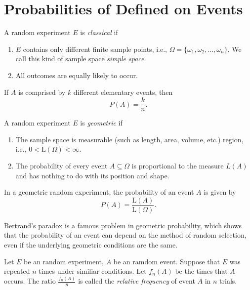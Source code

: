\section{Probabilities of Defined on Events}

\begin{definition}
  A random experiment \(E\) is \emph{classical} if
  \begin{enumerate}
    \item \(E\) contains only different finite sample points, i.e., \(\Omega = \{\omega_1, \omega_2, \dots, \omega_n\}\). We call this kind of sample space \emph{simple space}.
    \item All outcomes are equally likely to occur.
  \end{enumerate}
\end{definition}

If \(A\) is comprised by \(k\) different elementary events, then
\[
  P(A) = \frac{k}{n}.
\]

\begin{definition}
  A random experiment \(E\) is \emph{geometric} if
  \begin{enumerate}
    \item The sample space is measurable (such as length, area, volume, etc.) region, i.e., \(0 < \mathrm{L}(\Omega) < \infty\).
    \item The probability of every event \(A \subseteq \Omega\) is proportional to the measure \(L(A)\) and has nothing to do with its position and shape.
  \end{enumerate}
\end{definition}

In a geometric random experiment, the probability of an event \(A\) is given by
\[
  P(A) = \frac{\mathrm{L}(A)}{\mathrm{L}(\Omega)}.
\]

Bertrand's paradox is a famous problem in geometric probability, which shows that the probability of an event can depend on the method of random selection, even if the underlying geometric conditions are the same.

\begin{definition}
  Let \(E\) be an random experiment, \(A\) be an ramdom event. Suppose that \(E\) was repeated \(n\) times under similiar conditions. Let \(f_n(A)\) be the times that \(A\) occurs. The ratio \(\frac{f_n(A)}{n}\) is called the \emph{relative frequency} of event \(A\) in \(n\) trials.
\end{definition}

